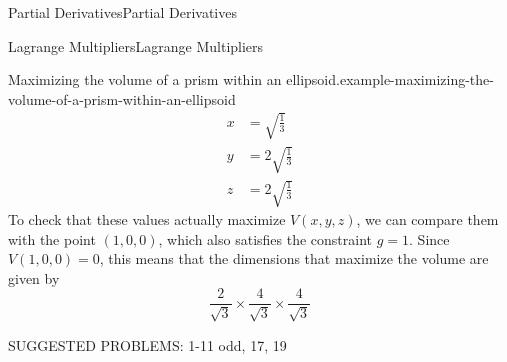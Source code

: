 \documentclass[10pt,]{book}
\numberwithin{equation}{section}
\begin{document}
\begin{chapterptx}{Partial Derivatives}{}{Partial Derivatives}{}{}
\begin{sectionptx}{Lagrange Multipliers}{}{Lagrange Multipliers}{}{}
\begin{example}{Maximizing the volume of a prism within an ellipsoid.}{example-maximizing-the-volume-of-a-prism-within-an-ellipsoid}
\begin{align*}
x & = \sqrt{\frac{1}{3}} \\
y & = 2\sqrt{\frac{1}{3}} \\
z & = 2\sqrt{\frac{1}{3}} 
\end{align*}
To check that these values actually maximize \(V(x,y,z)\), we can compare them with the point \((1,0,0)\), which also satisfies the constraint \(g = 1\). Since \(V(1,0,0) = 0\), this means that the dimensions that maximize the volume are given by%
\begin{equation*}
\frac{2}{\sqrt{3}}\times\frac{4}{\sqrt{3}}\times\frac{4}{\sqrt{3}}
\end{equation*}
%
\end{example}
\hypertarget{p-1238}{}%
SUGGESTED PROBLEMS: 1-11 odd, 17, 19%
\end{sectionptx}
\end{chapterptx}
%
%
\typeout{************************************************}
\typeout{************************************************}
%
\end{document}
